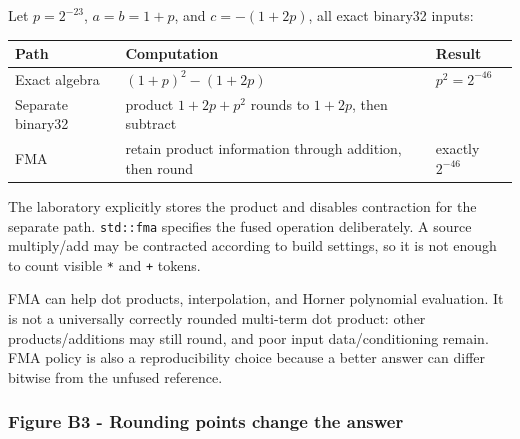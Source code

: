Let \(p=2^{-23}\), \(a=b=1+p\), and \(c=-(1+2p)\), all exact binary32 inputs:

{\def\LTcaptype{none} %
\begin{longtable}[]{@{}
  >{\raggedright\arraybackslash}p{}
  >{\raggedright\arraybackslash}p{}
  >{\raggedright\arraybackslash}p{}@{}}
\toprule\noalign{}
\begin{minipage}[b]{\linewidth}\raggedright
Path
\end{minipage} & \begin{minipage}[b]{\linewidth}\raggedright
Computation
\end{minipage} & \begin{minipage}[b]{\linewidth}\raggedright
Result
\end{minipage} \\
\midrule\noalign{}
\endhead
\bottomrule\noalign{}
\endlastfoot
Exact algebra & \((1+p)^2-(1+2p)\) & \(p^2=2^{-46}\) \\
Separate binary32 & product \(1+2p+p^2\) rounds to \(1+2p\), then subtract & 0 \\
FMA & retain product information through addition, then round & exactly \(2^{-46}\) \\
\end{longtable}
}

The laboratory explicitly stores the product and disables contraction for the separate path. \texttt{std::fma} specifies the fused operation deliberately. A source multiply/add may be contracted according to build settings, so it is not enough to count visible \texttt{*} and \texttt{+} tokens.

FMA can help dot products, interpolation, and Horner polynomial evaluation. It is not a universally correctly rounded multi-term dot product: other products/additions may still round, and poor input data/conditioning remain. FMA policy is also a reproducibility choice because a better answer can differ bitwise from the unfused reference.

\subsubsection{Figure B3 - Rounding points change the answer}\label{01-foundations-i-ch001-figure-b3---rounding-points-change-the-answer}

\hypertarget{01-foundations-i-ch001-figure-b3---rounding-points-change-the-answer}{}

